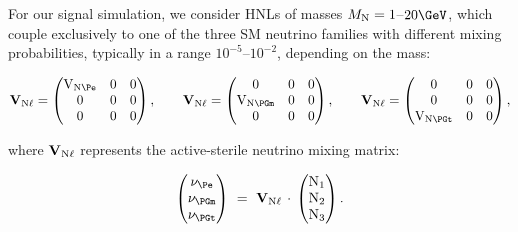 For our signal simulation, we consider HNLs of masses
$M_{\mathrm{N}} = 1$--$20\GeV$, which couple
exclusively to one of the three SM neutrino families with different
mixing probabilities, typically in a range $10^{-5}$--$10^{-2}$,
depending on the mass:
\begin{linenomath}
\begin{equation}
  \mathbf{V}_{\hnl\ell} =
  \begin{pmatrix}
    \mathrm{V}_{\hnl\Pe} & 0 & 0 \\
    0                   & 0 & 0 \\
    0                   & 0 & 0 \\
  \end{pmatrix},
\quad\quad
  \mathbf{V}_{\hnl\ell} =
  \begin{pmatrix}
    0                    & 0 & 0 \\
    \mathrm{V}_{\hnl\PGm} & 0 & 0 \\
    0                    & 0 & 0 \\
  \end{pmatrix},
\quad\quad
  \mathbf{V}_{\hnl\ell} = 
  \begin{pmatrix}
    0                    & 0 & 0 \\
    0                    & 0 & 0 \\
    \mathrm{V}_{\hnl\PGt} & 0 & 0 \\
  \end{pmatrix},
\end{equation}
\end{linenomath}
where $\mathbf{V}_{\mathrm{N}\ell}$ represents the active-sterile neutrino
mixing matrix:
\begin{linenomath}
\begin{equation}
  \begin{pmatrix}
    \nu_{\Pe}  \\
    \nu_{\PGm} \\
    \nu_{\PGt} \\
  \end{pmatrix} ~=~
  \mathbf{V}_{\hnl\ell}\,\cdot\,
  \begin{pmatrix}
    \hnl_{1} \\
    \hnl_{2} \\
    \hnl_{3} \\
  \end{pmatrix}.
\end{equation}
\end{linenomath}

